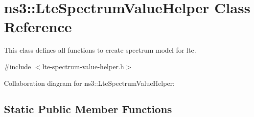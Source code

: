 \hypertarget{classns3_1_1LteSpectrumValueHelper}{}\section{ns3\+:\+:Lte\+Spectrum\+Value\+Helper Class Reference}
\label{classns3_1_1LteSpectrumValueHelper}


This class defines all functions to create spectrum model for lte.  




{\ttfamily \#include $<$lte-\/spectrum-\/value-\/helper.\+h$>$}



Collaboration diagram for ns3\+:\+:Lte\+Spectrum\+Value\+Helper\+:
\subsection*{Static Public Member Functions}

